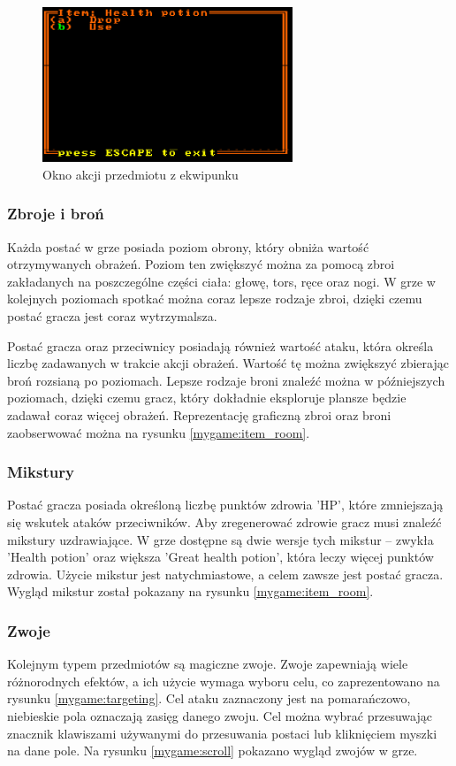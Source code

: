 \documentclass[12pt,twoside]{article}
\begin{document}
\FloatBarrier
\begin{figure}[ht]
	\centering
	\includegraphics[width=75mm]{images/mygame/item_menu.png}
	\caption{Okno akcji przedmiotu z ekwipunku}
	\label{mygame:item_menu}
\end{figure}
\FloatBarrier

\subsubsection{Zbroje i broń}
Każda postać w grze posiada poziom obrony, który obniża wartość otrzymywanych obrażeń. Poziom ten zwiększyć można za pomocą zbroi zakładanych na poszczególne części ciała: głowę, tors, ręce oraz nogi. W grze w kolejnych poziomach spotkać można coraz lepsze rodzaje zbroi, dzięki czemu postać gracza jest coraz wytrzymalsza.

Postać gracza oraz przeciwnicy posiadają również wartość ataku, która określa liczbę zadawanych w trakcie akcji obrażeń. Wartość tę można zwiększyć zbierając broń rozsianą po poziomach. Lepsze rodzaje broni znaleźć można w późniejszych poziomach, dzięki czemu gracz, który dokładnie eksploruje plansze będzie zadawał coraz więcej obrażeń. Reprezentację graficzną zbroi oraz broni zaobserwować można na rysunku \ref{mygame:item_room}.


\subsubsection{Mikstury}
Postać gracza posiada określoną liczbę punktów zdrowia 'HP', które zmniejszają się wskutek ataków przeciwników. Aby zregenerować zdrowie gracz musi znaleźć mikstury uzdrawiające. W grze dostępne są dwie wersje tych mikstur -- zwykła 'Health potion' oraz większa 'Great health potion', która leczy więcej punktów zdrowia. Użycie mikstur jest natychmiastowe, a celem zawsze jest postać gracza. Wygląd mikstur został pokazany na rysunku \ref{mygame:item_room}.


\subsubsection{Zwoje}
Kolejnym typem przedmiotów są magiczne zwoje. Zwoje zapewniają wiele różnorodnych efektów, a ich użycie wymaga wyboru celu, co zaprezentowano na rysunku \ref{mygame:targeting}. Cel ataku zaznaczony jest na pomarańczowo, niebieskie pola oznaczają zasięg danego zwoju. Cel można wybrać przesuwając znacznik klawiszami używanymi do przesuwania postaci lub kliknięciem myszki na dane pole. Na rysunku \ref{mygame:scroll} pokazano wygląd zwojów w grze.
\end{document}
